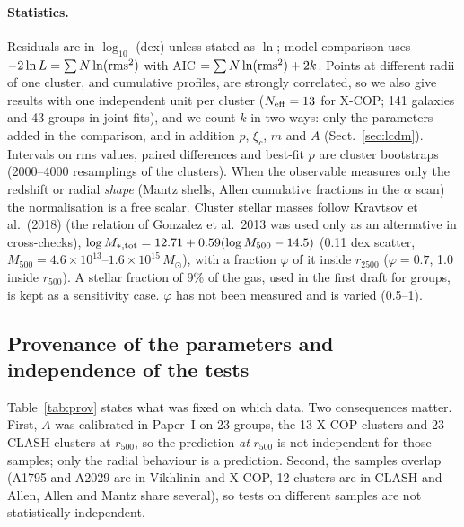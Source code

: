 \documentclass[11pt,a4paper]{article}
\newcommand{\Msun}{M_\odot}
\begin{document}
\paragraph{Statistics.} Residuals are in $\log_{10}$ (dex) unless stated as $\ln$; model comparison uses $-2\ln L=\sum N\ln({\rm rms}^2)$ with AIC $=\sum N\ln({\rm rms}^2)+2k$. Points at different radii of one cluster, and cumulative profiles, are strongly correlated, so we also give results with one independent unit per cluster ($N_{\rm eff}=13$ for X-COP; 141 galaxies and 43 groups in joint fits), and we count $k$ in two ways: only the parameters added in the comparison, and in addition $p$, $\xi_c$, $m$ and $A$ (Sect.~\ref{sec:lcdm}). Intervals on rms values, paired differences and best-fit $p$ are cluster bootstraps (2000--4000 resamplings of the clusters). When the observable measures only the redshift or radial \emph{shape} (Mantz shells, Allen cumulative fractions in the $\alpha$ scan) the normalisation is a free scalar. Cluster stellar masses follow Kravtsov et al.\ (2018) (the relation of Gonzalez et al.\ 2013 was used only as an alternative in cross-checks), $\log M_{*,\rm tot}=12.71+0.59(\log M_{500}-14.5)$ (0.11 dex scatter, $M_{500}=4.6\times10^{13}$--$1.6\times10^{15}\,\Msun$), with a fraction $\varphi$ of it inside $r_{2500}$ ($\varphi=0.7$, 1.0 inside $r_{500}$). A stellar fraction of 9\% of the gas, used in the first draft for groups, is kept as a sensitivity case. $\varphi$ has not been measured and is varied (0.5--1).

\subsection{Provenance of the parameters and independence of the tests}
Table~\ref{tab:prov} states what was fixed on which data. Two consequences matter. First, $A$ was calibrated in Paper~I on 23 groups, the 13 X-COP clusters and 23 CLASH clusters at $r_{500}$, so the prediction \emph{at} $r_{500}$ is not independent for those samples; only the radial behaviour is a prediction. Second, the samples overlap (A1795 and A2029 are in Vikhlinin and X-COP, 12 clusters are in CLASH and Allen, Allen and Mantz share several), so tests on different samples are not statistically independent.
\end{document}
